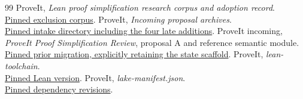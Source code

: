 \documentclass[11pt,a4paper]{article}
\begin{document}
\begin{thebibliography}{99}
ProveIt, \emph{Lean proof simplification research corpus and adoption record}.\\
\href{https://github.com/VladimirReshetnikov/ProveIt/tree/3b51c69d42ff99bc420698532af3fe1d1f9bd356/Computability/DiophantineConsistency/research/lean-proof-simplification}{Pinned exclusion corpus}.
ProveIt, \emph{Incoming proposal archives}.\\
\href{https://github.com/VladimirReshetnikov/ProveIt/tree/3b51c69d42ff99bc420698532af3fe1d1f9bd356/docs/incoming}{Pinned intake directory including the four late additions}.
ProveIt incoming, \emph{ProveIt Proof Simplification Review}, proposal A and reference semantic module.\\
\href{https://github.com/VladimirReshetnikov/ProveIt/blob/3b51c69d42ff99bc420698532af3fe1d1f9bd356/docs/incoming/ProveIt_Proof_Simplification_Review_2026-10-26.zip}{Pinned prior migration, explicitly retaining the state scaffold}.
ProveIt, \emph{lean-toolchain}.\\
\href{https://github.com/VladimirReshetnikov/ProveIt/blob/3b51c69d42ff99bc420698532af3fe1d1f9bd356/lean-toolchain}{Pinned Lean version}.
ProveIt, \emph{lake-manifest.json}.\\
\href{https://github.com/VladimirReshetnikov/ProveIt/blob/3b51c69d42ff99bc420698532af3fe1d1f9bd356/lake-manifest.json}{Pinned dependency revisions}.
\end{thebibliography}
\end{document}
